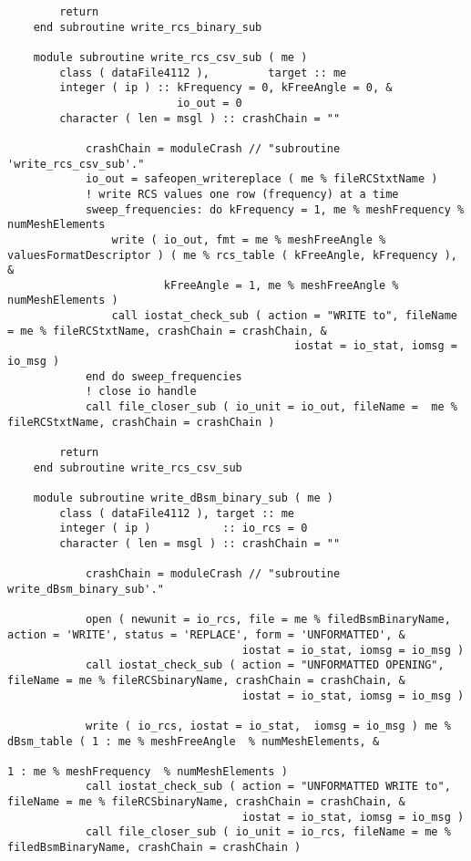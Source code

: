 {{\begin{lstlisting}
        return
    end subroutine write_rcs_binary_sub

    module subroutine write_rcs_csv_sub ( me )
        class ( dataFile4112 ),         target :: me
        integer ( ip ) :: kFrequency = 0, kFreeAngle = 0, &
                          io_out = 0
        character ( len = msgl ) :: crashChain = ""

            crashChain = moduleCrash // "subroutine 'write_rcs_csv_sub'."
            io_out = safeopen_writereplace ( me % fileRCStxtName )
            ! write RCS values one row (frequency) at a time
            sweep_frequencies: do kFrequency = 1, me % meshFrequency % numMeshElements
                write ( io_out, fmt = me % meshFreeAngle % valuesFormatDescriptor ) ( me % rcs_table ( kFreeAngle, kFrequency ), &
                        kFreeAngle = 1, me % meshFreeAngle % numMeshElements )
                call iostat_check_sub ( action = "WRITE to", fileName = me % fileRCStxtName, crashChain = crashChain, &
                                            iostat = io_stat, iomsg = io_msg )
            end do sweep_frequencies
            ! close io handle
            call file_closer_sub ( io_unit = io_out, fileName =  me % fileRCStxtName, crashChain = crashChain )

        return
    end subroutine write_rcs_csv_sub

    module subroutine write_dBsm_binary_sub ( me )
        class ( dataFile4112 ), target :: me
        integer ( ip )           :: io_rcs = 0
        character ( len = msgl ) :: crashChain = ""

            crashChain = moduleCrash // "subroutine write_dBsm_binary_sub'."

            open ( newunit = io_rcs, file = me % filedBsmBinaryName, action = 'WRITE', status = 'REPLACE', form = 'UNFORMATTED', &
                                    iostat = io_stat, iomsg = io_msg )
            call iostat_check_sub ( action = "UNFORMATTED OPENING", fileName = me % fileRCSbinaryName, crashChain = crashChain, &
                                    iostat = io_stat, iomsg = io_msg )

            write ( io_rcs, iostat = io_stat,  iomsg = io_msg ) me % dBsm_table ( 1 : me % meshFreeAngle  % numMeshElements, &
                                                                                  1 : me % meshFrequency  % numMeshElements )
            call iostat_check_sub ( action = "UNFORMATTED WRITE to", fileName = me % fileRCSbinaryName, crashChain = crashChain, &
                                    iostat = io_stat, iomsg = io_msg )
            call file_closer_sub ( io_unit = io_rcs, fileName = me % filedBsmBinaryName, crashChain = crashChain )


\end{lstlisting}}}
